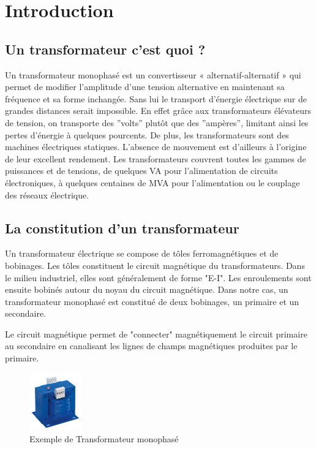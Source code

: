 \section{Introduction}


\subsection{Un transformateur c'est quoi ? }
	
	Un transformateur monophasé est un convertisseur « alternatif-alternatif » qui permet de modifier l'amplitude d'une tension alternative en maintenant sa fréquence et sa forme inchangée. Sans lui le transport d'énergie électrique sur de grandes distances serait impossible. En effet grâce aux transformateurs élévateurs de tension, on transporte des ''volts'' plutôt que des ''ampères'', limitant ainsi les pertes d'énergie à quelques pourcents. De plus, les transformateurs sont des machines électriques statiques. L'absence de mouvement est d'ailleurs à l'origine de leur excellent rendement. Les transformateurs couvrent toutes les gammes de puissances et de tensions, de quelques VA pour l'alimentation de circuits électroniques, à quelques centaines de MVA pour l'alimentation ou le couplage des réseaux électrique. 

\subsection{La constitution d'un transformateur}
	
	Un transformateur électrique se compose de tôles ferromagnétiques et de bobinages. Les tôles constituent le circuit magnétique du transformateurs. Dans le milieu industriel, elles sont généralement de forme "E-I". 
	Les enroulements sont ensuite bobinés autour du noyau du circuit magnétique. Dans notre cas, un transformateur monophasé est constitué de deux bobinages, un primaire et un secondaire. 

 	
	Le circuit magnétique permet de "connecter"  magnétiquement le circuit primaire au secondaire en canalisant les lignes de champs magnétiques produites par le primaire.

\begin{figure}[ht]
	\begin{center}
	\includegraphics[width=0.2\textwidth]{images/TP_intro_transfo}
	\caption{Exemple de Transformateur monophasé}\label{img:Transfomono}
	\end{center}
\end{figure}
\FloatBarrier 


